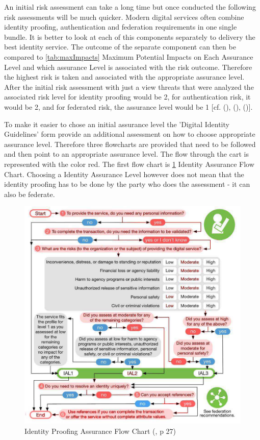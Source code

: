 An initial risk assessment can take a long time but once conducted the following risk assessments will be much quicker. Modern digital services often combine identity proofing, authentication and federation requirements in one single bundle. It is better to look at each of this components separately to delivery the best identity service. The outcome of the separate component can then be compared to \ref{tab:maxImpacts} Maximum Potential Impacts on Each Assurance Level and which assurance Level is associated with the risk outcome. Therefore the highest risk is taken and associated with the appropriate assurance level. After the initial risk assessment with just a view threats that were analyzed the associated risk level for identity proofing would be 2, for authentication risk, it would be 2, and for federated risk, the assurance level would be 1 [cf. (\cite{NIST:2017:DIG}), (\cite{NIST:2018:RMF}), (\cite{Hudson:2015:SecurityRisk})].

To make it easier to chose an initial assurance level the 'Digital Identity Guidelines' form \cite{NIST:2017:DIG} provide an additional assessment on how to choose appropriate assurance level. Therefore three flowcharts are provided that need to be followed and then point to an appropriate assurance level. The flow through the cart is represented with the color red. The first flow chart is \ref{fig:ialflow} Identity Assurance Flow Chart. Choosing a Identity Assurance Level however does not mean that the identity proofing has to be done by the party who does the assessment - it can also be federate. 

\begin{figure}[h]
	\centering
	\includegraphics[width=0.9\linewidth]{images/ial_flow}
	\caption{Identity Proofing Assurance Flow Chart (\cite{NIST:2017:DIG}, p 27)}
	\label{fig:ialflow}
\end{figure}

